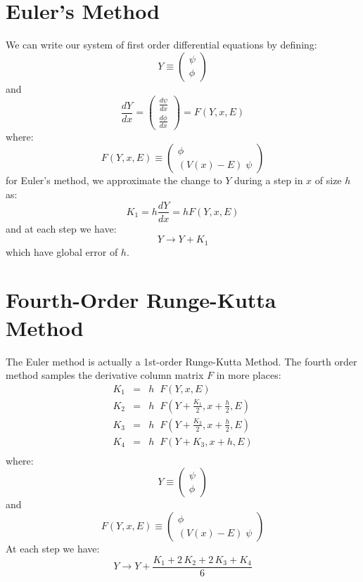 \documentclass[12pt]{book}
\begin{document}
\section{Euler's Method}
We can write our system of first order differential equations by defining:
\begin{equation}
Y \equiv \begin{pmatrix} \psi \\ \phi \end{pmatrix}
\end{equation}
and
\begin{equation}
\frac{dY}{dx} = \begin{pmatrix} {\displaystyle \frac{d\psi}{dx}} \\[10pt] {\displaystyle \frac{d\phi}{dx}} \end{pmatrix} = F(Y,x,E)
\end{equation}
where:
\begin{equation}
F(Y,x,E) \equiv \begin{pmatrix} \phi \\ (V(x)-E)\;\psi \end{pmatrix}
\end{equation}
for Euler's method, we approximate the change to $Y$ during a step in $x$ of size $h$ as:
$$K_1 = h \frac{dY}{dx} = h F(Y, x, E)$$
and at each step we have:
$$Y \to Y + K_1$$
which have global error of $h$.

\section{Fourth-Order Runge-Kutta Method}
The Euler method is actually a 1st-order Runge-Kutta Method.  The fourth order method samples the derivative column matrix $F$ in more places:
\begin{eqnarray*}
K_1 &=& h \; \; F(Y, x, E) \\[5pt]
K_2 &=& h \; \; F\left(Y + \frac{K_1}{2}, x+\frac{h}{2}, E\right) \\[5pt]
K_3 &=& h \; \; F\left(Y + \frac{K_2}{2}, x+\frac{h}{2}, E\right) \\[5pt]
K_4 &=& h \; \; F(Y+K_3, x+h, E) \\
\end{eqnarray*}
where:
\begin{equation}
Y \equiv \begin{pmatrix} \psi \\ \phi \end{pmatrix}
\end{equation}
and
\begin{equation}
F(Y,x,E) \equiv \begin{pmatrix} \phi \\ (V(x)-E)\;\psi \end{pmatrix}
\end{equation}
At each step we have:
$$Y \to Y + \frac{K_1 + 2\,K_2 + 2\, K_3 + K_4}{6}$$
\end{document}
